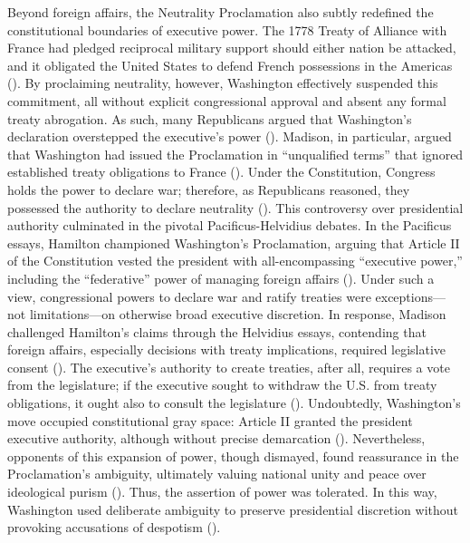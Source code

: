 Beyond foreign affairs, the Neutrality Proclamation also subtly redefined the constitutional boundaries of executive power. The 1778 Treaty of Alliance with France had pledged reciprocal military support should either nation be attacked, and it obligated the United States to defend French possessions in the Americas (\cite[p.\ 11–12]{reinstein2011}). By proclaiming neutrality, however, Washington effectively suspended this commitment, all without explicit congressional approval and absent any formal treaty abrogation. As such, many Republicans argued that Washington’s declaration overstepped the executive’s power (\cite[p.\ 126]{schmitt2000}). Madison, in particular, argued that Washington had issued the Proclamation in “unqualified terms” that ignored established treaty obligations to France (\cite[p.\ 126]{schmitt2000}). Under the Constitution, Congress holds the power to declare war; therefore, as Republicans reasoned, they possessed the authority to declare neutrality (\cites[p.\ 691]{chernow2011}[p.\ 127]{schmitt2000}[pp.\ 329–331]{prakash2001}). This controversy over presidential authority culminated in the pivotal Pacificus-Helvidius debates. In the Pacificus essays, Hamilton championed Washington’s Proclamation, arguing that Article II of the Constitution vested the president with all-encompassing “executive power,” including the “federative” power of managing foreign affairs (\cite[§\textsc{xi}, p.\ 12]{hamilton2007}). Under such a view, congressional powers to declare war and ratify treaties were exceptions—not limitations—on otherwise broad executive discretion. In response, Madison challenged Hamilton’s claims through the Helvidius essays, contending that foreign affairs, especially decisions with treaty implications, required legislative consent (\cite[p.\ 64]{hamilton2007}). The executive’s authority to create treaties, after all, requires a vote from the legislature; if the executive sought to withdraw the U.S. from treaty obligations, it ought also to consult the legislature (\cite[§2, cl. 2]{constitution}). Undoubtedly, Washington’s move occupied constitutional gray space: Article II granted the president executive authority, although without precise demarcation (\cite[pp.\ 445–446]{young2011}). Nevertheless, opponents of this expansion of power, though dismayed, found reassurance in the Proclamation’s ambiguity, ultimately valuing national unity and peace over ideological purism (\cite[p.\ 65, 75]{moats2021}). Thus, the assertion of power was tolerated. In this way, Washington used deliberate ambiguity to preserve presidential discretion without provoking accusations of despotism (\cite[p.\ 68]{moats2021}).

